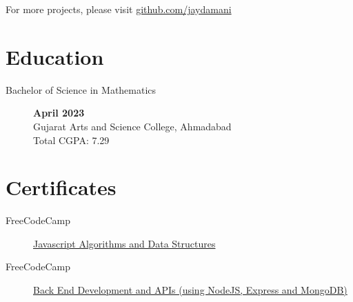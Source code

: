 \documentclass[a4paper,10pt]{article}
\begin{document}
For more projects, please visit \href{https://github.com/jaydamani}{github.com/jaydamani}

\section{Education}

\begin{description}
    \item[Bachelor of Science in Mathematics ] \hfill  \textbf{April 2023} \\
        Gujarat Arts and Science College, Ahmadabad
        \\ Total CGPA\@: 7.29
\end{description}

\section{Certificates}
\begin{description}
    \item[FreeCodeCamp]
        \href{https://www.freecodecamp.org/certification/jaydamani/javascript-algorithms-and-data-structures}{
            Javascript Algorithms and Data Structures
        }
    \item[FreeCodeCamp]
        \href{https://www.freecodecamp.org/certification/jaydamani/back-end-development-and-apis}{
            Back End Development and APIs (using NodeJS, Express and MongoDB)
        }
\end{description}
\end{document}
